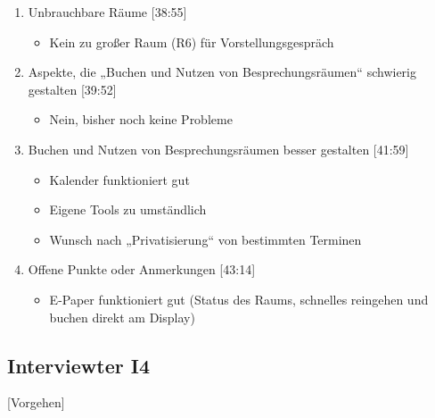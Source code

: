 \begin{enumerate}
    \item Unbrauchbare Räume [38:55]
     \begin{itemize}
        \item Kein zu großer Raum (R6) für Vorstellungsgespräch
    \end{itemize}
        
    \item Aspekte, die „Buchen und Nutzen von Besprechungsräumen“ schwierig gestalten [39:52] 
     \begin{itemize}
        \item Nein, bisher noch keine Probleme
    \end{itemize}

    \item Buchen und Nutzen von Besprechungsräumen besser gestalten [41:59]
     \begin{itemize}
        \item Kalender funktioniert gut
        \item Eigene Tools zu umständlich
        \item Wunsch nach „Privatisierung“ von bestimmten Terminen
    \end{itemize}
        
    \item Offene Punkte oder Anmerkungen [43:14]
     \begin{itemize}
        \item E-Paper funktioniert gut (Status des Raums, schnelles reingehen und buchen direkt am Display)
    \end{itemize}

\end{enumerate}

\subsection{Interviewter I4}
\label{subsec:interview-i4}

[Vorgehen]

